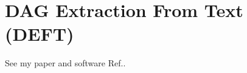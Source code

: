 \chapter{DAG Extraction From Text (DEFT)}
\label{ch-deft}
See my paper and software Ref.\cite{mappa-mundi}.